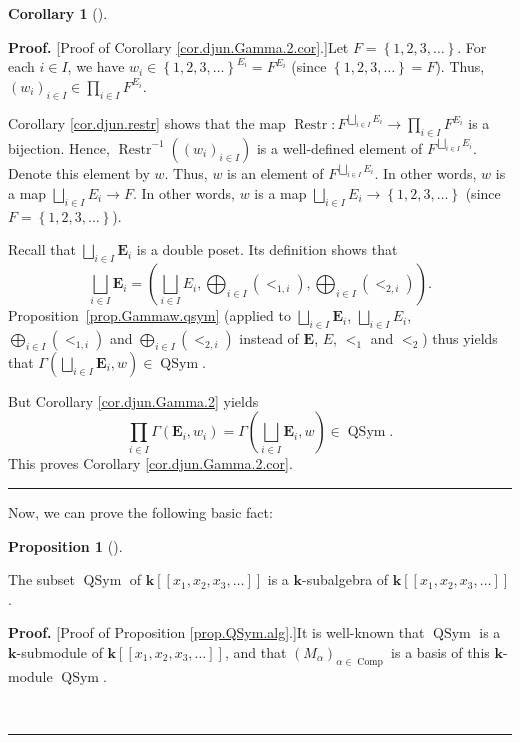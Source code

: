 \documentclass[numbers=enddot,12pt,final,onecolumn,notitlepage,abstracton]{scrartcl}
\theoremstyle{definition}
\newtheorem{prop}[theo]{Proposition}
\newenvironment{proposition}[1][]
{\begin{prop}[#1]\begin{leftbar}}
{\end{leftbar}\end{prop}}
\newtheorem{coro}[theo]{Corollary}
\newenvironment{corollary}[1][]
{\begin{coro}[#1]\begin{leftbar}}
{\end{leftbar}\end{coro}}
\newenvironment{proof}[1][Proof]{\noindent\textbf{#1.} }{\ \rule{0.5em}{0.5em}}
\let\prodnonlimits\prod
\renewcommand{\prod}{\prodnonlimits\limits}
\newenvironment{verlong}{}{}
\begin{document}
\begin{verlong}
\begin{footnotesize}
\begin{corollary}
\end{corollary}

\begin{proof}
[Proof of Corollary \ref{cor.djun.Gamma.2.cor}.]Let $F=\left\{  1,2,3,\ldots
\right\}  $. For each $i\in I$, we have $w_{i}\in\left\{  1,2,3,\ldots
\right\}  ^{E_{i}}=F^{E_{i}}$ (since $\left\{  1,2,3,\ldots\right\}  =F$).
Thus, $\left(  w_{i}\right)  _{i\in I}\in\prod_{i\in I}F^{E_{i}}$.

Corollary \ref{cor.djun.restr} shows that the map $\operatorname*{Restr}%
:F^{\bigsqcup_{i\in I}E_{i}}\rightarrow\prod_{i\in I}F^{E_{i}}$ is a
bijection. Hence, $\operatorname*{Restr}\nolimits^{-1}\left(  \left(
w_{i}\right)  _{i\in I}\right)  $ is a well-defined element of $F^{\bigsqcup
_{i\in I}E_{i}}$. Denote this element by $w$. Thus, $w$ is an element of
$F^{\bigsqcup_{i\in I}E_{i}}$. In other words, $w$ is a map $\bigsqcup_{i\in
I}E_{i}\rightarrow F$. In other words, $w$ is a map $\bigsqcup_{i\in I}%
E_{i}\rightarrow\left\{  1,2,3,\ldots\right\}  $ (since $F=\left\{
1,2,3,\ldots\right\}  $).

Recall that $\bigsqcup_{i\in I}\mathbf{E}_{i}$ is a double poset. Its
definition shows that%
\[
\bigsqcup_{i\in I}\mathbf{E}_{i}=\left(  \bigsqcup_{i\in I}E_{i}%
,\bigoplus_{i\in I}\left(  <_{1,i}\right)  ,\bigoplus_{i\in I}\left(
<_{2,i}\right)  \right)  .
\]
Proposition~\ref{prop.Gammaw.qsym} (applied to $\bigsqcup_{i\in I}%
\mathbf{E}_{i}$, $\bigsqcup_{i\in I}E_{i}$, $\bigoplus_{i\in I}\left(
<_{1,i}\right)  $ and $\bigoplus_{i\in I}\left(  <_{2,i}\right)  $ instead of
$\mathbf{E}$, $E$, $<_{1}$ and $<_{2}$) thus yields that $\Gamma\left(
\bigsqcup_{i\in I}\mathbf{E}_{i},w\right)  \in\operatorname*{QSym}$.

But Corollary \ref{cor.djun.Gamma.2} yields%
\[
\prod_{i\in I}\Gamma\left(  \mathbf{E}_{i},w_{i}\right)  =\Gamma\left(
\bigsqcup_{i\in I}\mathbf{E}_{i},w\right)  \in\operatorname*{QSym}.
\]
This proves Corollary \ref{cor.djun.Gamma.2.cor}.
\end{proof}

Now, we can prove the following basic fact:

\begin{proposition}
\label{prop.QSym.alg}The subset $\operatorname*{QSym}$ of $\mathbf{k}\left[
\left[  x_{1},x_{2},x_{3},\ldots\right]  \right]  $ is a $\mathbf{k}%
$-subalgebra of $\mathbf{k}\left[  \left[  x_{1},x_{2},x_{3},\ldots\right]
\right]  $.
\end{proposition}

\begin{proof}
[Proof of Proposition \ref{prop.QSym.alg}.]It is well-known that
$\operatorname*{QSym}$ is a $\mathbf{k}$-submodule of $\mathbf{k}\left[
\left[  x_{1},x_{2},x_{3},\ldots\right]  \right]  $, and that $\left(
M_{\alpha}\right)  _{\alpha\in{\operatorname{Comp}}}$ is a basis of this
$\mathbf{k}$-module $\operatorname*{QSym}$.


\end{proof}
\end{footnotesize}
\end{verlong}
\end{document}
